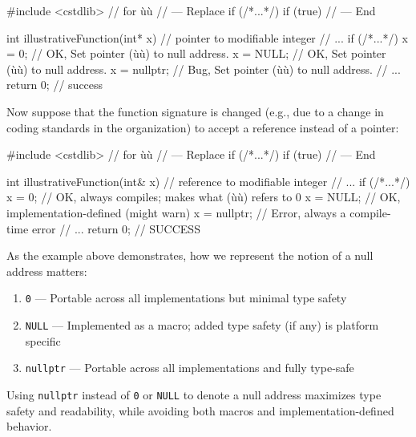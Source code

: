 \begin{emcppshiddenlisting}[emcppsbatch=e1]
#include <cstdlib>  // for ù{}ù
// --- Replace
    if (/*...*/)
    if (true)
// --- End
\end{emcppshiddenlisting}
\begin{emcppslisting}[emcppsbatch=e1]
int illustrativeFunction(int* x)   // pointer to modifiable integer
{
    // ...
    if (/*...*/)
    {
        x = 0;       // OK, Set pointer (ù{}ù) to null address.
        x = NULL;    // OK, Set pointer (ù{}ù) to null address.
        x = nullptr; // Bug, Set pointer (ù{}ù) to null address.
    }
    // ...
    return 0;    // success
}
\end{emcppslisting}


Now suppose that the function signature is changed (e.g., due to a
change in coding standards in the organization) to accept a reference
instead of a pointer:

\begin{emcppshiddenlisting}[emcppsbatch=e2]
#include <cstdlib>  // for ù{}ù
// --- Replace
    if (/*...*/)
    if (true)
// --- End
\end{emcppshiddenlisting}
\begin{emcppslisting}[emcppsbatch=e2]
int illustrativeFunction(int& x)  // reference to modifiable integer
{
    // ...
    if (/*...*/)
    {
        x = 0;       // OK, always compiles; makes what (ù{}ù) refers to 0
        x = NULL;    // OK, implementation-defined (might warn)
        x = nullptr; // Error, always a compile-time error
    }
    // ...
    return 0;    // SUCCESS
}
\end{emcppslisting}


As the example above demonstrates, how we represent the notion of a
null address matters:
\begin{enumerate}
\item{\lstinline!0! — Portable across all implementations but minimal type safety}
\item{\lstinline!NULL! — Implemented as a macro; added type safety (if any) is platform specific}
\item{\lstinline!nullptr! — Portable across all implementations and fully type-safe}
\end{enumerate}
Using \lstinline!nullptr! instead of \lstinline!0! or \lstinline!NULL! to denote
a null address maximizes type safety and readability, while avoiding
both macros and implementation-defined behavior.

